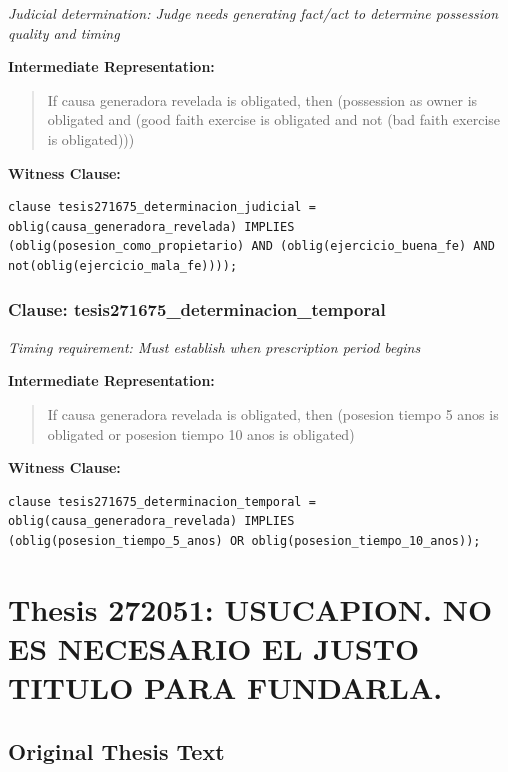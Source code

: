 \documentclass[11pt,a4paper]{article}
\begin{document}
\textit{Judicial determination: Judge needs generating fact/act to determine possession quality and timing}

\textbf{Intermediate Representation:}

\begin{quote}
If causa generadora revelada is obligated, then (possession as owner is obligated and (good faith exercise is obligated and not (bad faith exercise is obligated)))
\end{quote}

\textbf{Witness Clause:}

\begin{lstlisting}[style=witnessstyle, language=Witness]
clause tesis271675_determinacion_judicial = oblig(causa_generadora_revelada) IMPLIES (oblig(posesion_como_propietario) AND (oblig(ejercicio_buena_fe) AND not(oblig(ejercicio_mala_fe))));
\end{lstlisting}

\subsubsection{Clause: tesis271675\_determinacion\_temporal}

\textit{Timing requirement: Must establish when prescription period begins}

\textbf{Intermediate Representation:}

\begin{quote}
If causa generadora revelada is obligated, then (posesion tiempo 5 anos is obligated or posesion tiempo 10 anos is obligated)
\end{quote}

\textbf{Witness Clause:}

\begin{lstlisting}[style=witnessstyle, language=Witness]
clause tesis271675_determinacion_temporal = oblig(causa_generadora_revelada) IMPLIES (oblig(posesion_tiempo_5_anos) OR oblig(posesion_tiempo_10_anos));
\end{lstlisting}

\newpage

\section{Thesis 272051: USUCAPION. NO ES NECESARIO EL JUSTO TITULO PARA FUNDARLA.}
\label{thesis:272051}

\subsection{Original Thesis Text}
\end{document}
